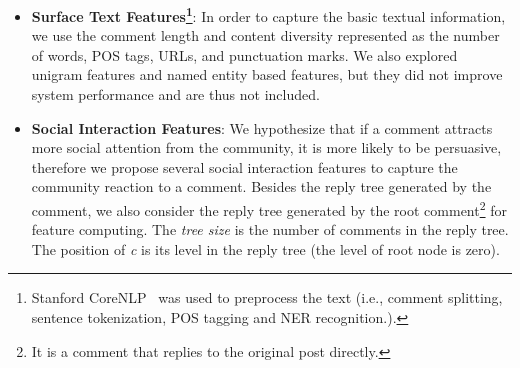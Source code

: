 \documentclass[11pt]{article}
\begin{document}
\begin{itemize}[leftmargin=.15in]
	\item \textbf{Surface Text Features\footnote{Stanford CoreNLP~\cite{manning-EtAl:2014:P14-5} was used to preprocess the text (i.e., comment splitting, sentence tokenization, POS tagging and NER recognition.).}}: In order to capture the basic textual information, we use the comment length  and content diversity represented as the number of words, POS tags, URLs, and punctuation marks. We also explored unigram features and named entity based features, but they did not improve system performance and are thus not included. 
	
	\item \textbf{Social Interaction Features}: We hypothesize that if a comment attracts more social attention from the community, it is more likely to be persuasive, therefore we propose several social interaction features to capture the community reaction to a comment. Besides the reply tree generated by the comment, we also consider the reply tree generated by the root comment\footnote{It is a comment that replies to the original post directly.} for feature computing.  The \emph{tree size} is the number of comments in the reply tree. The position of \emph{c} is its level in the reply tree (the level of root node is zero).%
	

\end{itemize}
\end{document}
